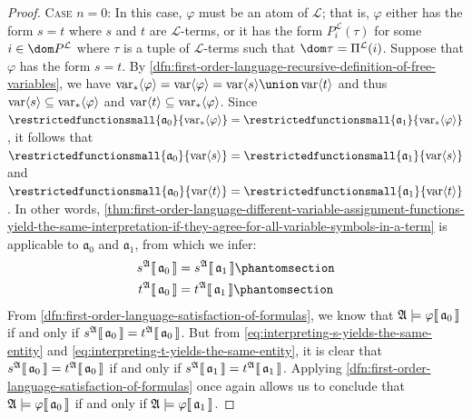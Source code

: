 \begin{proof}
    \vspace{0.3cm}
    \noindent
    {\scshape Case} \( n = 0 \):
    In this case, \( \varphi \) must be an atom of \( \mathcal{L} \); that is, \( \varphi \) either has the form \( s = t \) where \( s \) and \( t \)
    are \( \mathcal{L} \)-terms, or it has the form \( P^{\mathcal{L}}_{i}(\tau) \) for some \( i \in \dom P^{\mathcal{L}} \) where \( \tau \) is a tuple of
    \( \mathcal{L} \)-terms such that \( \dom \tau = \Pi^{\mathcal{L}}(i) \).
    Suppose that \( \varphi \) has the form \( s = t \).
    By \cref{dfn:first-order-language-recursive-definition-of-free-variables}, we have
    \( \folfreevars{\varphi} = \folvars{\varphi} = \folvars{s} \union \folvars{t}  \) and thus
    \( \operatorname{var} \langle s\rangle \subseteq \operatorname{var}_{\ast} \langle\varphi\rangle \) and \( \operatorname{var} \langle t\rangle \subseteq \operatorname{var}_{\ast} \langle\varphi\rangle \).
    Since \( \restrictedfunctionsmall{\mathfrak{a}_{0}}{\folfreevars{\varphi}} = \restrictedfunctionsmall{\mathfrak{a}_{1}}{\folfreevars{\varphi}} \),
    it follows that \( \restrictedfunctionsmall{\mathfrak{a}_{0}}{\folvars{s}} = \restrictedfunctionsmall{\mathfrak{a}_{1}}{\folvars{s}} \)
    and \( \restrictedfunctionsmall{\mathfrak{a}_{0}}{\folvars{t}} = \restrictedfunctionsmall{\mathfrak{a}_{1}}{\folvars{t}} \).
    In other words, \cref{thm:first-order-language-different-variable-assignment-functions-yield-the-same-interpretation-if-they-agree-for-all-variable-symbols-in-a-term}
    is applicable to \( \mathfrak{a}_{0} \) and \( \mathfrak{a}_{1} \), from which we infer:
    \begin{align}
        \folterminterpretation{s}{\mathfrak{A}}{\mathfrak{a}_{0}} &=
        \folterminterpretation{s}{\mathfrak{A}}{\mathfrak{a}_{1}} \phantomsection \label{eq:interpreting-s-yields-the-same-entity}\\
        \folterminterpretation{t}{\mathfrak{A}}{\mathfrak{a}_{0}} &=
        \folterminterpretation{t}{\mathfrak{A}}{\mathfrak{a}_{1}} \phantomsection \label{eq:interpreting-t-yields-the-same-entity}
    \end{align}
    From \cref{dfn:first-order-language-satisfaction-of-formulas}, we know that \(  \mathfrak{A} \models \varphi\llbracket\, \mathfrak{a}_{0} \,\rrbracket \)
    if and only if \( s^{\mathfrak{A}}\llbracket\, \mathfrak{a}_{0} \,\rrbracket = t^{\mathfrak{A}}\llbracket\, \mathfrak{a}_{0} \,\rrbracket \).
    But from \eqref{eq:interpreting-s-yields-the-same-entity} and \eqref{eq:interpreting-t-yields-the-same-entity}, it is clear that
    \( s^{\mathfrak{A}}\llbracket\, \mathfrak{a}_{0} \,\rrbracket = t^{\mathfrak{A}}\llbracket\, \mathfrak{a}_{0} \,\rrbracket \) if and only if
    \( s^{\mathfrak{A}}\llbracket\, \mathfrak{a}_{1} \,\rrbracket = t^{\mathfrak{A}}\llbracket\, \mathfrak{a}_{1} \,\rrbracket \).
    Applying \cref{dfn:first-order-language-satisfaction-of-formulas} once again allows us to conclude that
    \(  \mathfrak{A} \models \varphi\llbracket\, \mathfrak{a}_{0} \,\rrbracket \) if and only if \(  \mathfrak{A} \models \varphi\llbracket\, \mathfrak{a}_{1} \,\rrbracket \).


\end{proof}
